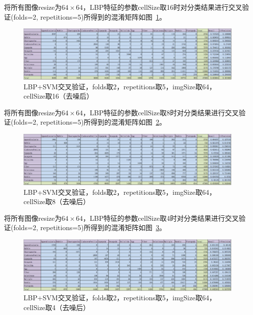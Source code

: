 \documentclass[12pt]{article}
\begin{document}
将所有图像resize为$64 \times 64$，LBP特征的参数cellSize取16时对分类结果进行交叉验证(folds=2, repetitions=5)所得到的混淆矩阵如图~\ref{fig:LBP-SVM-2-folds-5-repetitions-16-64-noNoise}。
\begin{figure}[!ht]
\centering
\includegraphics[width=1.0\linewidth]{LBP-SVM-2-folds-5-repetitions-16-64-noNoise}
\caption{LBP+SVM交叉验证，folds取2，repetitions取5，imgSize取64，cellSize取16（去噪后）}
\label{fig:LBP-SVM-2-folds-5-repetitions-16-64-noNoise}
\end{figure}

将所有图像resize为$64 \times 64$，LBP特征的参数cellSize取8时对分类结果进行交叉验证(folds=2, repetitions=5)所得到的混淆矩阵如图~\ref{fig:LBP-SVM-2-folds-5-repetitions-8-64-noNoise}。
\begin{figure}[!ht]
\centering
\includegraphics[width=1.0\linewidth]{LBP-SVM-2-folds-5-repetitions-8-64-noNoise}
\caption{LBP+SVM交叉验证，folds取2，repetitions取5，imgSize取64，cellSize取8（去噪后）}
\label{fig:LBP-SVM-2-folds-5-repetitions-8-64-noNoise}
\end{figure}

将所有图像resize为$64 \times 64$，LBP特征的参数cellSize取4时对分类结果进行交叉验证(folds=2, repetitions=5)所得到的混淆矩阵如图~\ref{fig:LBP-SVM-2-folds-5-repetitions-4-64-noNoise}。
\begin{figure}[!ht]
\centering
\includegraphics[width=1.0\linewidth]{LBP-SVM-2-folds-5-repetitions-4-64-noNoise}
\caption{LBP+SVM交叉验证，folds取2，repetitions取5，imgSize取64，cellSize取4（去噪后）}
\label{fig:LBP-SVM-2-folds-5-repetitions-4-64-noNoise}
\end{figure}
\end{document}

